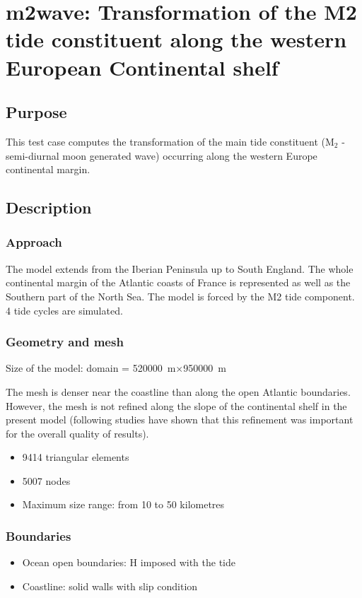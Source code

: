 \chapter{m2wave: Transformation of the M2 tide constituent along the western European Continental shelf}

\section{Purpose}
This test case computes the transformation of the main tide constituent
(M$_2$ - semi-diurnal moon generated wave) occurring along the western Europe continental margin.

\section{Description}
\subsection{Approach}
The model extends from the Iberian Peninsula up to South England. The
whole continental margin of the Atlantic coasts of France is represented
as well as the Southern part of the North Sea. The model is forced by
the M2 tide component. 4 tide cycles are simulated.

\subsection{Geometry and mesh}
Size of the model: domain = 520000~m$\times$950000~m

The mesh is denser near the coastline than along the open Atlantic boundaries.
However, the mesh is not refined along the slope of the continental shelf in
the present model (following studies have shown that this refinement was
important for the overall quality of results).

\begin{itemize}
\item 9414 triangular elements
\item 5007 nodes
\item Maximum size range: from 10 to 50 kilometres
\end{itemize}

\subsection{Boundaries}

\begin{itemize}
\item Ocean open boundaries: H imposed with the tide
\item Coastline: solid walls with slip condition
\end{itemize}

